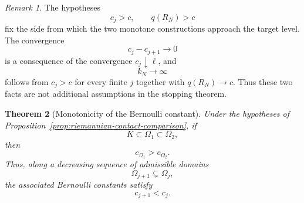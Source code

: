 \documentclass[11pt,a4paper]{article}
\newtheorem{theorem}{Theorem}[section]
\theoremstyle{definition}
\theoremstyle{remark}
\newtheorem{remark}[theorem]{Remark}
\begin{document}
\begin{remark}
The hypotheses
\[
c_j>c,\qquad q(R_N)>c
\]
fix the side from which the two monotone constructions approach the
target level. The convergence
\[
c_j-c_{j+1}\to0
\]
is a consequence of the convergence $c_j\downarrow\ell$, and
\[
k_N\to\infty
\]
follows from $c_j>c$ for every finite $j$ together with
$q(R_N)\to c$. Thus these two facts are not additional assumptions in
the stopping theorem.
\end{remark}



\begin{theorem}[Monotonicity of the Bernoulli constant]
\label{thm:monotonicity-c-riemannian}
Under the hypotheses of Proposition~\ref{prop:riemannian-contact-comparison},
if
\[
K\subset\Omega_1\subset\Omega_2,
\]
then
\[
c_{\Omega_1}>c_{\Omega_2}.
\]
Thus, along a decreasing sequence of admissible domains
\[
\Omega_{j+1}\subsetneq\Omega_j,
\]
the associated Bernoulli constants satisfy
\[
c_{j+1}<c_j.
\]
\end{theorem}
\end{document}
